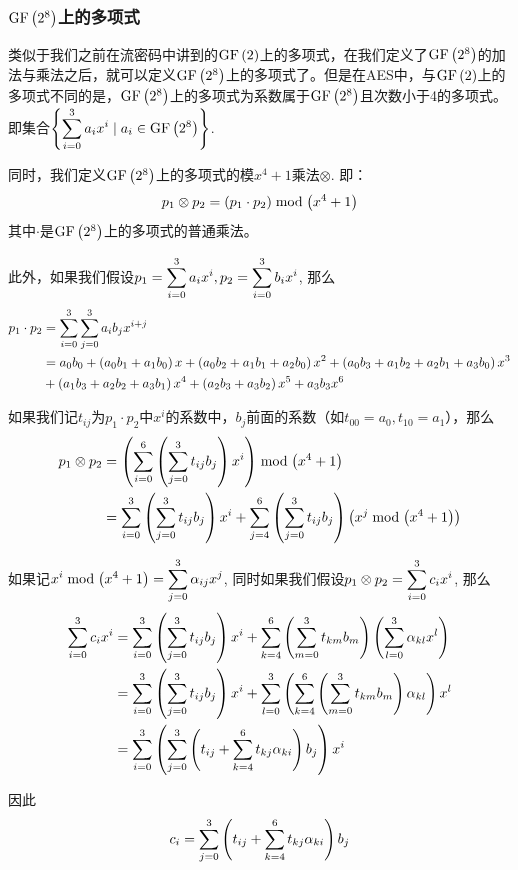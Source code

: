 \subsubsection{$\mathrm{GF}\left( {2^8}\right)$上的多项式}
类似于我们之前在流密码中讲到的$\mathrm{GF}\left( {2}\right)$上的多项式，在我们定义了$\mathrm{GF}\left( {2^8}\right)$的加法与乘法之后，就可以定义$\mathrm{GF}\left( {2^8}\right)$上的多项式了。但是在AES中，与$\mathrm{GF}\left( {2}\right)$上的多项式不同的是，$\mathrm{GF}\left( {2^8}\right)$上的多项式为系数属于$\mathrm{GF}\left( {2^8}\right)$且次数小于4的多项式。即集合$\displaystyle\left\{ {\sum_{i=0}^3a_ix^i\mid a_i\in\mathrm{GF}\left( {2^8}\right)} \right\}$.\par
同时，我们定义$\mathrm{GF}\left( {2^8}\right)$上的多项式的模$x^4+1$乘法$\otimes$. 即：
\begin{equation}
p_1\otimes p_2=\left( {p_1\cdot p_2}\right)\bmod{\left( {x^4+1}\right)}
\end{equation}
其中$\cdot$是$\mathrm{GF}\left( {2^8}\right)$上的多项式的普通乘法。\par
此外，如果我们假设$\displaystyle p_1=\sum_{i=0}^3a_ix^i, p_2=\sum_{i=0}^3b_ix^i$, 那么
\begin{align*}
p_1\cdot p_2&=\sum_{i=0}^3\sum_{j=0}^3a_ib_jx^{i+j}\\
&=a_0b_0+\left( {a_0b_1+a_1b_0}\right)x+\left( {a_0b_2+a_1b_1+a_2b_0}\right)x^2+\left( {a_0b_3+a_1b_2+a_2b_1+a_3b_0}\right)x^3\\
&+\left( {a_1b_3+a_2b_2+a_3b_1}\right)x^4+\left( {a_2b_3+a_3b_2}\right)x^5+a_3b_3x^6
\end{align*}

如果我们记$t_{ij}$为$p_1\cdot p_2$中$x^i$的系数中，$b_j$前面的系数（如$t_{00}=a_0, t_{10}=a_1$），那么
\begin{align*}
p_1\otimes p_2&=\left( {\sum_{i=0}^6\left( {\sum_{j=0}^3t_{ij}b_j}\right)x^i}\right)\bmod{\left( {x^4+1}\right)}\\
&=\sum_{i=0}^3\left( {\sum_{j=0}^3t_{ij}b_j}\right)x^i+\sum_{j=4}^6\left( {\sum_{j=0}^3t_{ij}b_j}\right)\left( {x^j\bmod{\left( {x^4+1}\right)}}\right)
\end{align*}

如果记$\displaystyle x^i\bmod{\left( {x^4+1}\right)}=\sum_{j=0}^3{\alpha_{ij}x^j}$, 同时如果我们假设$\displaystyle p_1\otimes p_2=\sum_{i=0}^3c_ix^i$, 那么
\begin{align*}
\sum_{i=0}^3c_ix^i&=\sum_{i=0}^3\left( {\sum_{j=0}^3t_{ij}b_j}\right)x^i+\sum_{k=4}^6\left( {\sum_{m=0}^3t_{km}b_m}\right)\left( {\sum_{l=0}^3{\alpha_{kl}x^l}}\right)\\
&=\sum_{i=0}^3\left( {\sum_{j=0}^3t_{ij}b_j}\right)x^i+\sum_{l=0}^3\left( {\sum_{k=4}^6\left( {\sum_{m=0}^3t_{km}b_m}\right)\alpha_{kl}}\right)x^l\\
&=\sum_{i=0}^3\left( {\sum_{j=0}^3\left( {t_{ij}+\sum_{k=4}^6t_{kj}\alpha_{ki}}\right)b_j}\right)x^i
\end{align*}

因此
\begin{equation}
c_i=\sum_{j=0}^3\left( {t_{ij}+\sum_{k=4}^6t_{kj}\alpha_{ki}}\right)b_j
\end{equation}


